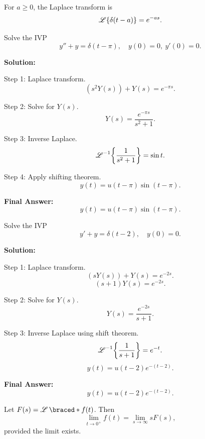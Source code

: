   \begin{theorem}
    For $a \geq 0$, the Laplace transform is
    \[
    \operatorname{\mathscr{L}}\{\delta(t-a)\} = e^{-as}.
    \]
  \end{theorem}

  
  \begin{example}
    Solve the IVP
    \[
    y'' + y = \delta(t-\pi), \quad y(0)=0,\ y'(0)=0.
    \]

    \textbf{Solution:}

    Step 1: Laplace transform.
    \[
    (s^2Y(s)) + Y(s) = e^{-\pi s}.
    \]

    Step 2: Solve for $Y(s)$.
    \[
    Y(s) = \frac{e^{-\pi s}}{s^2+1}.
    \]

    Step 3: Inverse Laplace.
    \[
    \operatorname{\mathscr{L}}^{-1}\!\left\{\frac{1}{s^2+1}\right\} = \sin t.
    \]

    Step 4: Apply shifting theorem.
    \[
    y(t) = u(t-\pi)\sin(t-\pi).
    \]

    \textbf{Final Answer:}
    \[
    \boxed{y(t) = u(t-\pi)\sin(t-\pi)}.
    \]
  \end{example}


  \begin{example}
    Solve the IVP
    \[
    y' + y = \delta(t-2), \quad y(0)=0.
    \]

    \textbf{Solution:}

    Step 1: Laplace transform.
    \[
    (sY(s)) + Y(s) = e^{-2s}.
    \]
    \[
    (s+1)Y(s) = e^{-2s}.
    \]

    Step 2: Solve for $Y(s)$.
    \[
    Y(s) = \frac{e^{-2s}}{s+1}.
    \]

    Step 3: Inverse Laplace using shift theorem.
    \[
    \operatorname{\mathscr{L}}^{-1}\!\left\{\frac{1}{s+1}\right\} = e^{-t}.
    \]
    \[
    y(t) = u(t-2)e^{-(t-2)}.
    \]

    \textbf{Final Answer:}
    \[
    \boxed{y(t) = u(t-2)e^{-(t-2)}}.
    \]
  \end{example}



  \begin{marginfigure}
    
  \end{marginfigure}


  \begin{theorem}
    Let $F(s) = \laplace\braced*{f(t)}$. Then
    \[
    \lim_{t \to 0^+} f(t) = \lim_{s \to \infty} sF(s),
    \]
    provided the limit exists.
  \end{theorem}


